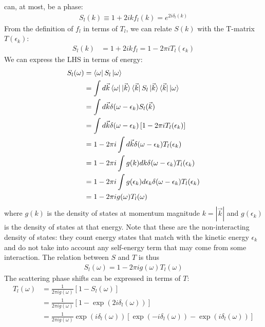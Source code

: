 \documentclass[12pt,twoside]{report}
\numberwithin{equation}{section}
\begin{document}
can, at most, be a phase:
\begin{equation}\begin{aligned}
	S_l (k)\equiv 1 + 2i k f_l (k) = e^{2i\delta_l(k)}
\end{aligned}\end{equation}
From the definition of \(f_l\) in terms of \(T_l\), we can relate \(S(k)\) with the T-matrix \(T(\epsilon_k)\):
\begin{equation}\begin{aligned}
	S_l(k) &= 1 + 2i k f_l = 1 - 2 \pi i T_l(\epsilon_k)
\end{aligned}\end{equation}
We can express the LHS in terms of energy:
\begin{equation}\begin{aligned}
	S_l(\omega) &= \bra{\omega}S_l\ket{\omega} \\
			   &= \int d\vec k \bra{\omega}\ket{\vec k}\bra{\vec k}S_l\ket{\vec k}\bra{\vec k}\ket{\omega}\\
			   &= \int d\vec k \delta(\omega - \epsilon_k)S_l(\vec k)\\
			   &= \int d\vec k \delta(\omega - \epsilon_k)\left[1 - 2 \pi i T_l(\epsilon_k)\right]\\
			   &= 1 - 2 \pi i \int d\vec k \delta(\omega - \epsilon_k)T_l(\epsilon_k)\\
			   &= 1 - 2 \pi i \int g(k) d k \delta(\omega - \epsilon_k)T_l(\epsilon_k)\\
			   &= 1 - 2 \pi i \int g(\epsilon_k) d \epsilon_k \delta(\omega - \epsilon_k)T_l(\epsilon_k)\\
			   &= 1 - 2 \pi i g(\omega) T_l(\omega)
\end{aligned}\end{equation}
where \(g(k)\) is the density of states at momentum magnitude \(k = |\vec k|\) and \(g(\epsilon_k)\) is the density of states at that energy. Note that these are the non-interacting density of states: they count energy states that match with the kinetic energy \(\epsilon_k\) and do not take into account any self-energy term that may come from some interaction. The relation between \(S\) and \(T\) is thus
\begin{equation}\begin{aligned}
	\label{S_in_T}
	S_l(\omega) = 1 - 2 \pi i g(\omega) T_l(\omega)
\end{aligned}\end{equation}
The scattering phase shifts can be expressed in terms of \(T\):
\begin{equation}\begin{aligned}
	T_l(\omega) &= \frac{1}{2\pi i g(\omega)}\left[ 1 - S_l(\omega) \right]\\
		    &= \frac{1}{2\pi i g(\omega)}\left[1 - \exp\left( 2 i \delta_l(\omega) \right)\right]\\
		    &=\frac{1}{2\pi i g(\omega)}\exp\left(i \delta_l(\omega) \right)\left[\exp\left( - i \delta_l(\omega) \right) - \exp\left(i \delta_l(\omega) \right)\right]
\end{aligned}\end{equation}
\end{document}
